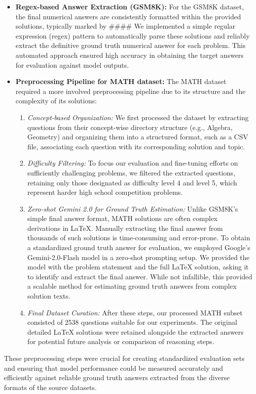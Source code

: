 \documentclass[11pt]{article}
\begin{document}
\begin{itemize}
    \item \textbf{Regex-based Answer Extraction (GSM8K):}
    For the GSM8K dataset, the final numerical answers are consistently formatted within the provided solutions, typically marked by \#\#\#\#  We implemented a simple regular expression (regex) pattern to automatically parse these solutions and reliably extract the definitive ground truth numerical answer for each problem. This automated approach ensured high accuracy in obtaining the target answers for evaluation against model outputs.

    \item \textbf{Preprocessing Pipeline for MATH dataset:}
    The MATH dataset required a more involved preprocessing pipeline due to its structure and the complexity of its solutions:
    \begin{enumerate}
        \item \textit{Concept-based Organization:} We first processed the dataset by extracting questions from their concept-wise directory structure (e.g., Algebra, Geometry) and organizing them into a structured format, such as a CSV file, associating each question with its corresponding solution and topic.
        \item \textit{Difficulty Filtering:} To focus our evaluation and fine-tuning efforts on sufficiently challenging problems, we filtered the extracted questions, retaining only those designated as difficulty level 4 and level 5, which represent harder high school competition problems.
        \item \textit{Zero-shot Gemini 2.0 for Ground Truth Estimation:} Unlike GSM8K's simple final answer format, MATH solutions are often complex derivations in LaTeX. Manually extracting the final answer from thousands of such solutions is time-consuming and error-prone. To obtain a standardized ground truth answer for evaluation, we employed Google's Gemini-2.0-Flash model in a zero-shot prompting setup. We provided the model with the problem statement and the full LaTeX solution, asking it to identify and extract the final answer. While not infallible, this provided a scalable method for estimating ground truth answers from complex solution texts.
        \item \textit{Final Dataset Curation:} After these steps, our processed MATH subset consisted of 2538 questions suitable for our experiments. The original detailed LaTeX solutions were retained alongside the extracted answers for potential future analysis or comparison of reasoning steps.
    \end{enumerate}

\end{itemize}
These preprocessing steps were crucial for creating standardized evaluation sets and ensuring that model performance could be measured accurately and efficiently against reliable ground truth answers extracted from the diverse formats of the source datasets.
\end{document}
